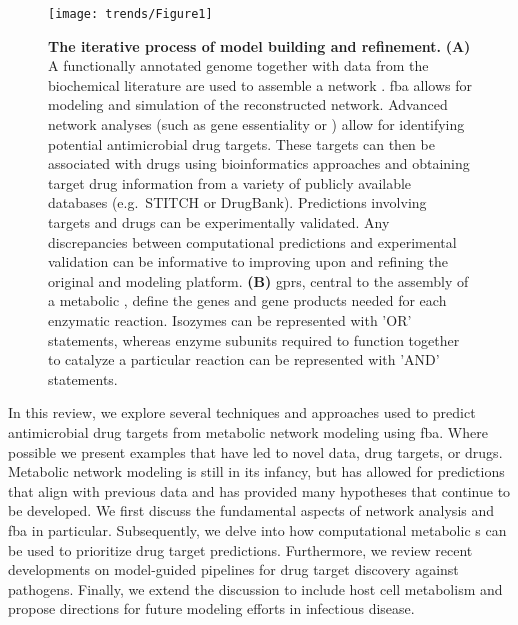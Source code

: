 \begin{figure}[h!]
  \centering
  \texttt{[image: trends/Figure1]}
  \caption[The iterative process of model building and refinement]{
       \textbf{The iterative process of model building and refinement.}
       \textbf{(A)} A 
       functionally annotated genome together with data from the 
       biochemical literature are used to assemble a network 
       . \gls{fba} allows for 
       modeling and simulation of the reconstructed network. 
       Advanced network analyses (such as gene essentiality or 
       ) allow for identifying potential 
       antimicrobial drug targets. These targets can then be 
       associated with drugs using bioinformatics approaches 
       and obtaining target drug information from a variety 
       of publicly available databases (e.g.\ STITCH or DrugBank). 
       Predictions involving targets and drugs can be experimentally 
       validated. Any discrepancies between computational 
       predictions and experimental validation can be informative 
       to improving upon and refining the original  
       and modeling platform. \textbf{(B)} \glspl{gpr}, 
       central to the assembly of a metabolic 
       , define the genes and gene products needed 
       for each enzymatic reaction. Isozymes can be represented 
       with 'OR' statements, whereas enzyme subunits required 
       to function together to catalyze a particular reaction 
       can be represented with 'AND' statements.
  }
  \label{trends:fig1}
\end{figure}



In this review, we explore several techniques and approaches 
used to predict antimicrobial drug targets from metabolic network 
modeling using \gls{fba}. Where possible we present examples that have 
led to novel data, drug targets, or drugs. Metabolic network 
modeling is still in its infancy, but has allowed for predictions 
that align with previous data and has provided many hypotheses 
that continue to be developed. We first discuss the fundamental 
aspects of network analysis and \gls{fba} in particular. Subsequently, 
we delve into how computational metabolic s can be 
used to prioritize drug target predictions. Furthermore, we 
review recent developments on model-guided pipelines for drug 
target discovery against pathogens. Finally, we extend the discussion 
to include host cell metabolism and propose directions for future 
modeling efforts in infectious disease.

